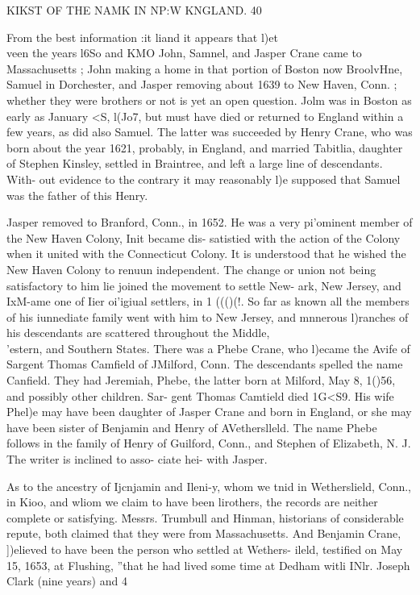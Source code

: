 KIKST OF THE NAMK IN NP:W KNGLAND. 40 

From the best information :it liand it appears that l)et\\veen the 
years l6So and KMO John, Samnel, and Jasper Crane came to 
Massachusetts ; John making a home in that portion of Boston 
now BroolvHne, Samuel in Dorchester, and Jasper removing 
about 1639 to New Haven, Conn. ; whether they were brothers 
or not is yet an open question. Jolm was in Boston as early as 
January <S, l(Jo7, but must have died or returned to England 
within a few years, as did also Samuel. The latter was succeeded 
by Henry Crane, who was born about the year 1621, probably, 
in England, and married Tabitlia, daughter of Stephen Kinsley, 
settled in Braintree, and left a large line of descendants. With- 
out evidence to the contrary it may reasonably l)e supposed that 
Samuel was the father of this Henry. 

Jasper removed to Branford, Conn., in 1652. He was a very 
pi'ominent member of the New Haven Colony, Init became dis- 
satistied with the action of the Colony when it united with the 
Connecticut Colony. It is understood that he wished the New 
Haven Colony to renuun independent. The change or union not 
being satisfactory to him lie joined the movement to settle New- 
ark, New Jersey, and IxM-ame one of Iier oi'igiual settlers, in 
1 ((()(!. So far as known all the members of his iunnediate family 
went with him to New Jersey, and mnnerous l)ranches of his 
descendants are scattered throughout the Middle, \^\\'estern, and 
Southern States. There was a Phebe Crane, who l)ecame the Avife 
of Sargent Thomas Camfield of JMilford, Conn. The descendants 
spelled the name Canfield. They had Jeremiah, Phebe, the latter 
born at Milford, May 8, 1()56, and possibly other children. Sar- 
gent Thomas Camtield died 1G<S9. His wife Phel)e may have 
been daughter of Jasper Crane and born in England, or she may 
have been sister of Benjamin and Henry of AVetherslleld. The 
name Phebe follows in the family of Henry of Guilford, Conn., 
and Stephen of Elizabeth, N. J. The writer is inclined to asso- 
ciate hei- with Jasper. 

As to the ancestry of Ijcnjamin and Ileni-y, whom we tnid in 
Wetherslield, Conn., in Kioo, and wliom we claim to have been 
lirothers, the records are neither complete or satisfying. \^Messrs. 
Trumbull and Hinman, historians of considerable repute, both 
claimed that they were from Massachusetts. And Benjamin 
Crane, ])elieved to have been the person who settled at Wethers- 
ileld, testified on May 15, 1653, at Flushing, ''that he had lived 
some time at Dedham witli INlr. Joseph Clark (nine years) and 
4 




